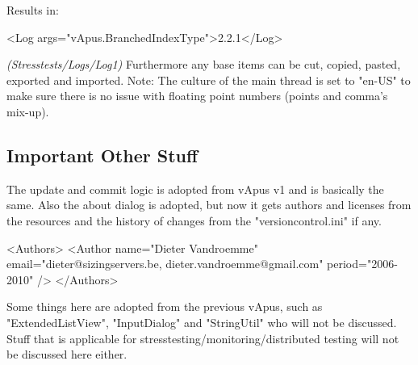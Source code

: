 Results in:
\begin{codelisting}
<Log args="vApus.BranchedIndexType">2.2.1</Log>
\end{codelisting}
{\it(Stresstests/Logs/Log1)}
\npar
Furthermore any base items can be cut, copied, pasted, exported and imported.
Note: The culture of the main thread is set to "en-US" to make sure there is no issue with floating point numbers (points and comma's mix-up).

\subsection{Important Other Stuff}
The update and commit logic is adopted from vApus v1 and is basically the same. Also the about dialog is adopted, but now it gets authors and licenses from the resources and the history of changes from the "versioncontrol.ini" if any.
\begin{codelisting}
<Authors>
<Author name="Dieter Vandroemme" email="dieter@sizingservers.be, dieter.vandroemme@gmail.com" period="2006-2010" />
</Authors>
\end{codelisting}

Some things here are adopted from the previous vApus, such as "ExtendedListView", "InputDialog" and "StringUtil" who will not be discussed. Stuff that is applicable for stresstesting/monitoring/distributed testing will not be discussed here either.

